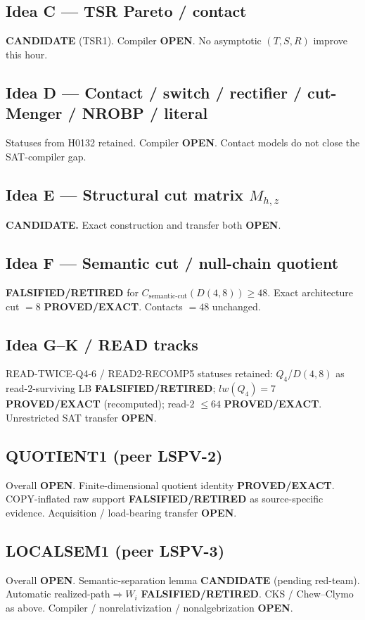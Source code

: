 \documentclass[11pt]{article}
\begin{document}
\subsection*{Idea C --- TSR Pareto / contact}
\textbf{CANDIDATE} (TSR1). Compiler \textbf{OPEN}. No asymptotic $(T,S,R)$ improve this hour.

\subsection*{Idea D --- Contact / switch / rectifier / cut-Menger / NROBP / literal}
Statuses from H0132 retained. Compiler \textbf{OPEN}. Contact models do not close the SAT-compiler gap.

\subsection*{Idea E --- Structural cut matrix $M_{h,z}$}
\textbf{CANDIDATE.} Exact construction and transfer both \textbf{OPEN}.

\subsection*{Idea F --- Semantic cut / null-chain quotient}
\textbf{FALSIFIED/RETIRED} for $C_{\mathrm{semantic\textrm{-}cut}}(D(4,8))\ge48$.
Exact architecture cut $=8$ \textbf{PROVED/EXACT}. Contacts $=48$ unchanged.

\subsection*{Idea G--K / READ tracks}
READ-TWICE-Q4-6 / READ2-RECOMP5 statuses retained: $Q_4$/$D(4,8)$ as read-$2$-surviving LB
\textbf{FALSIFIED/RETIRED}; $lw(Q_4)=7$ \textbf{PROVED/EXACT} (recomputed); read-$2$ $\le64$
\textbf{PROVED/EXACT}. Unrestricted SAT transfer \textbf{OPEN}.

\subsection*{QUOTIENT1 (peer LSPV-2)}
Overall \textbf{OPEN}. Finite-dimensional quotient identity \textbf{PROVED/EXACT}.
COPY-inflated raw support \textbf{FALSIFIED/RETIRED} as source-specific evidence.
Acquisition / load-bearing transfer \textbf{OPEN}.

\subsection*{LOCALSEM1 (peer LSPV-3)}
Overall \textbf{OPEN}. Semantic-separation lemma \textbf{CANDIDATE} (pending red-team).
Automatic realized-path$\Rightarrow W_i$ \textbf{FALSIFIED/RETIRED}.
CKS / Chew--Clymo as above. Compiler / nonrelativization / nonalgebrization \textbf{OPEN}.
\end{document}

